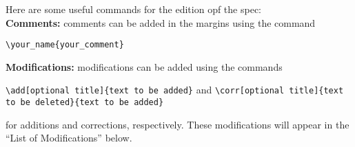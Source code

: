 Here are some useful commands for the edition opf the spec:\\

\noindent\textbf{Comments:} comments can be added in the margins using the command
\begin{center}
    \Verb|\your_name{your_comment}|
\end{center}

\noindent\textbf{Modifications:} modifications can be added using the commands
\begin{center}
\Verb|\add[optional title]{text to be added}| and \Verb|\corr[optional title]{text to be deleted}{text to be added}|
\end{center}

for additions and corrections, respectively.
These modifications will appear in the ``List of Modifications'' below.\\

\begingroup
    \let\cleardoublepage\relax
    \listofmodification
\endgroup
\newpage

